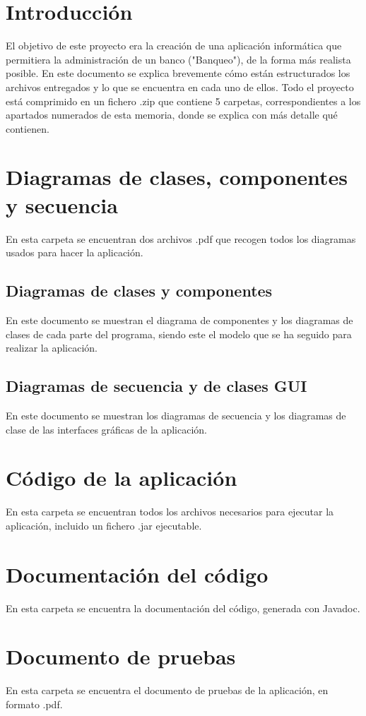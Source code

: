 \documentclass[12pt]{article}
\begin{document}
\section*{Introducción}
El objetivo de este proyecto era la creación de una aplicación informática que permitiera la administración de un banco ("Banqueo"), de la forma más realista posible.
En este documento se explica brevemente cómo están estructurados los archivos entregados y lo que se encuentra en cada uno de ellos. Todo el proyecto está comprimido en un fichero .zip que contiene 5 carpetas, correspondientes a los apartados numerados de esta memoria, donde se explica con más detalle qué contienen.

\section{Diagramas de clases, componentes y secuencia}
En esta carpeta se encuentran dos archivos .pdf que recogen todos los diagramas usados para hacer la aplicación.
\subsection{Diagramas de clases y componentes}
En este documento se muestran el diagrama de componentes y los diagramas de clases de cada parte del programa, siendo este el modelo que se ha seguido para realizar la aplicación.
\subsection{Diagramas de secuencia y de clases GUI}
En este documento se muestran los diagramas de secuencia y los diagramas de clase de las interfaces gráficas de la aplicación.

\section{Código de la aplicación}
En esta carpeta se encuentran todos los archivos necesarios para ejecutar la aplicación, incluido un fichero .jar ejecutable.

\section{Documentación del código}
En esta carpeta se encuentra la documentación del código, generada con Javadoc.

\section{Documento de pruebas}
En esta carpeta se encuentra el documento de pruebas de la aplicación, en formato .pdf.
\end{document}
